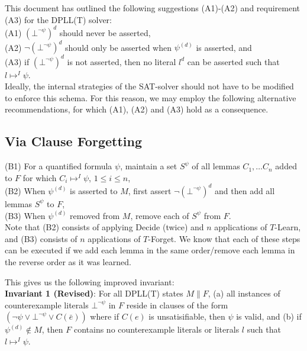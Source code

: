 \documentclass{llncs}
\begin{document}
This document has outlined the following suggestions (A1)-(A2) and requirement (A3) for the DPLL(T) solver: \\

\noindent (A1) $(\bot^{\neg \psi})^d$ should never be asserted, \\
(A2) $\neg (\bot^{\neg \psi})^d$ should only be asserted when $\psi^{(d)}$ is asserted, and \\
(A3) if $(\bot^{\neg \psi})^d$ is not asserted, then no literal $l^d$ can be asserted such that $l \mapsto^I \psi$. \\

Ideally, the internal strategies of the SAT-solver should not have to be modified to enforce this schema.
For this reason, we may employ the following alternative recommendations, for which (A1), (A2) and (A3) hold as a consequence.

\subsection{Via Clause Forgetting}

\noindent (B1) For a quantified formula $\psi$, maintain a set $S^\psi$ of all lemmas $C_1, \ldots C_n$ added to $F$ for which $C_i \mapsto^I \psi$, $1 \leq i \leq n$, \\
(B2) When $\psi^{(d)}$ is asserted to $M$, first assert $\neg (\bot^{\neg \psi})^d$ and then add all lemmas $S^\psi$ to $F$, \\
(B3) When $\psi^{(d)}$ removed from $M$, remove each of $S^\psi$ from $F$. \\

Note that (B2) consists of applying Decide (twice) and $n$ applications of $T$-Learn, and (B3) consists of $n$ applications of $T$-Forget.
We know that each of these steps can be executed if we add each lemma in the same order/remove each lemma in the reverse order as it was learned.

This gives us the following improved invariant: \\

{\bf Invariant 1 (Revised)}:
For all DPLL(T) states $M \parallel F$,
(a) all instances of counterexample literals $\bot^{\neg \psi}$ in $F$ reside in clauses of the form $( \neg \psi \vee \bot^{\neg \psi} \vee C(\bar{e}) )$ where if $C(e)$ is unsatisifiable, then $\psi$ is valid, and
(b) if $\psi^{(d)} \not\in M$, then $F$ contains no counterexample literals or literals $l$ such that $l \mapsto^I \psi$. \\
\end{document}
